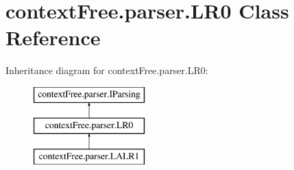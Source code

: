 \hypertarget{classcontext_free_1_1parser_1_1_l_r0}{\section{context\-Free.\-parser.\-L\-R0 Class Reference}
\label{classcontext_free_1_1parser_1_1_l_r0}
}
Inheritance diagram for context\-Free.\-parser.\-L\-R0\-:\begin{figure}[H]
\begin{center}
\leavevmode
\includegraphics[height=3.000000cm]{classcontext_free_1_1parser_1_1_l_r0}
\end{center}
\end{figure}
